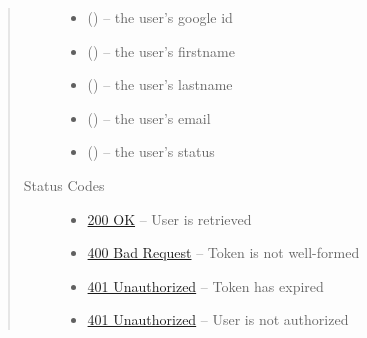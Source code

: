 \documentclass[letterpaper,10pt,english]{sphinxmanual}
\begin{document}
\begin{fulllineitems}
\begin{quote}
\begin{description}
\begin{itemize}
\item {} 
 () -- the user's google id

\item {} 
 () -- the user's firstname

\item {} 
 () -- the user's lastname

\item {} 
 () -- the user's email

\item {} 
 () -- the user's status

\end{itemize}

\item[{Status Codes}] \leavevmode\begin{itemize}
\item {} 
\href{http://www.w3.org/Protocols/rfc2616/rfc2616-sec10.html\#sec10.2.1}{200 OK} -- User is retrieved

\item {} 
\href{http://www.w3.org/Protocols/rfc2616/rfc2616-sec10.html\#sec10.4.1}{400 Bad Request} -- Token is not well-formed

\item {} 
\href{http://www.w3.org/Protocols/rfc2616/rfc2616-sec10.html\#sec10.4.2}{401 Unauthorized} -- Token has expired

\item {} 
\href{http://www.w3.org/Protocols/rfc2616/rfc2616-sec10.html\#sec10.4.2}{401 Unauthorized} -- User is not authorized

\end{itemize}

\end{description}\end{quote}

\end{fulllineitems}
\end{document}
